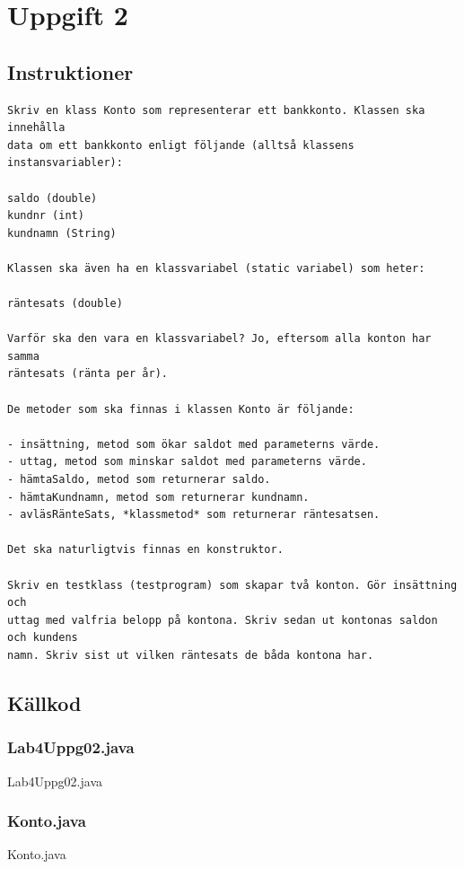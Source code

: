 \section{Uppgift 2}\label{sec:uppg02}

\subsection{Instruktioner}
\begin{Verbatim}[fontsize=\small]
Skriv en klass Konto som representerar ett bankkonto. Klassen ska innehålla
data om ett bankkonto enligt följande (alltså klassens instansvariabler):

saldo (double)
kundnr (int)
kundnamn (String)

Klassen ska även ha en klassvariabel (static variabel) som heter:

räntesats (double)

Varför ska den vara en klassvariabel? Jo, eftersom alla konton har samma
räntesats (ränta per år).

De metoder som ska finnas i klassen Konto är följande:

- insättning, metod som ökar saldot med parameterns värde.
- uttag, metod som minskar saldot med parameterns värde.
- hämtaSaldo, metod som returnerar saldo.
- hämtaKundnamn, metod som returnerar kundnamn.
- avläsRänteSats, *klassmetod* som returnerar räntesatsen.

Det ska naturligtvis finnas en konstruktor.

Skriv en testklass (testprogram) som skapar två konton. Gör insättning och
uttag med valfria belopp på kontona. Skriv sedan ut kontonas saldon och kundens
namn. Skriv sist ut vilken räntesats de båda kontona har.
\end{Verbatim}


\subsection{Källkod}
\subsubsection{Lab4Uppg02.java}
\caption{Lab4Uppg02.java}
\label{src:uppg02}

\subsubsection{Konto.java}
\caption{Konto.java}
\label{src:konto}

